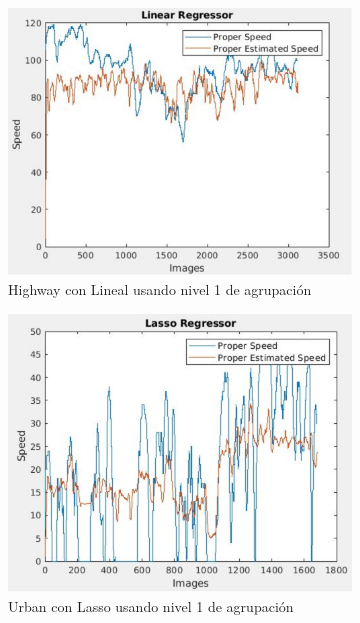 \begin{figure}[H]
  \centering
  \begin{subfigure}[b]{0.45\linewidth}
    \includegraphics[width=\linewidth]{Figuras/Lineal_Highway(Nivel_1).eps}
    \caption{Highway con Lineal usando nivel 1 de agrupación}
  \end{subfigure}
    \begin{subfigure}[b]{0.425\linewidth}
    \includegraphics[width=\linewidth]{Figuras/Lasso_Urban(Nivel_1).eps}
    \caption{Urban con Lasso usando nivel 1 de agrupación}
  \end{subfigure}
    \begin{subfigure}[b]{0.45\linewidth}

\end{subfigure}
\end{figure}
